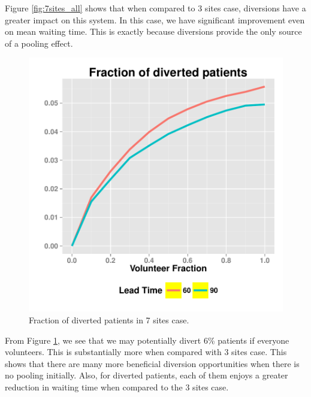 Figure \ref{fig:7sites_all} shows that when compared to 3 sites case,
diversions have a greater impact on this system. In this case, we have
significant improvement even on mean waiting time. This is exactly
because diversions provide the only source of a pooling effect.

\begin{figure}[htp]
\centering
\includegraphics[width=.6\textwidth]{chap3/numeric/pic/7sites_all_diversion}
\caption{Fraction of diverted patients in 7 sites case.}
\label{fig:7sites_all_diversion}
\end{figure}

From Figure \ref{fig:7sites_all_diversion}, we see that we may potentially
divert 6\% patients if everyone volunteers. This is substantially more when compared
with 3 sites case. This shows that there are many more
beneficial diversion opportunities when there is no pooling initially. Also, for
diverted patients, each of them enjoys a greater reduction in waiting time
when compared to the 3 sites case.
